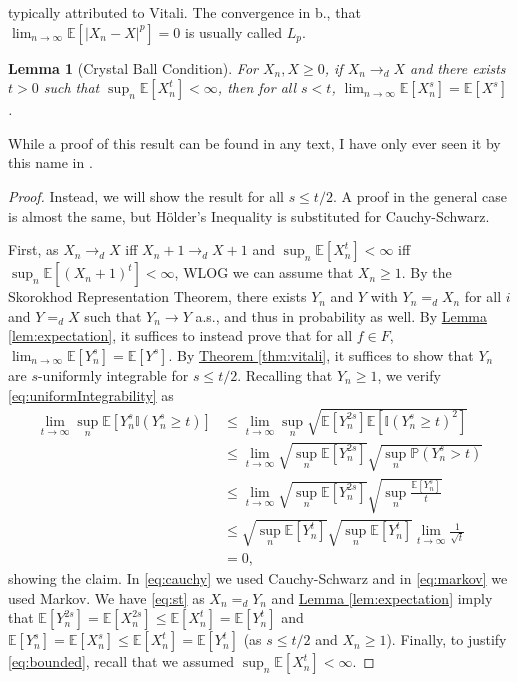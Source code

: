 \documentclass{article}
\newtheorem{lemma}{Lemma}
\theoremstyle{definition}
\renewcommand{\P}{\mathbb P}
\newcommand{\E}{\mathbb E}
\newcommand{\1}{\mathbb I}
\newcommand{\thmhref}[1]{\hyperref[#1]{Theorem \ref{#1}}}
\newcommand{\lemhref}[1]{\hyperref[#1]{Lemma \ref{#1}}}
\begin{document}
typically attributed to Vitali.  The convergence in b., that $\lim_{n
  \to \infty} \E[|X_n - X|^p] = 0$ is usually called $L_p$.
\begin{lemma}[Crystal Ball Condition]
  \label{lem:crystal}
  For $X_n,X \geq 0$, if $X_n \to_d X$ and there exists $t>0$ such that
  $\sup_{n} \E[X_n^t] < \infty$, then for all $s < t$, $\lim_{n \to
    \infty} \E[X_n^s] = \E[X^s]$.
\end{lemma}
While a proof of this result can be found in any text, I have only ever seen it by this name in \cite{resnick1998probability}.
\begin{proof}
  Instead, we will show the result for all $s \leq t/2$.  A proof in
  the general case is almost the same, but H\"older's Inequality is
  substituted for Cauchy-Schwarz.


  First, as $X_n \to_d X$ iff $X_{n}+1 \to_d X+1$ and $\sup_{n}
  \E[X_n^t] < \infty$ iff $\sup_{n} \E[(X_n+1)^t] < \infty$, WLOG we can
  assume that $X_n \geq 1$.  By the Skorokhod Representation Theorem,
  there exists $Y_{n}$ and $Y$ with $Y_{n} =_d X_{n}$ for all $i$ and
  $Y =_d X$ such that $Y_{n} \to Y$ a.s., and thus in probability as
  well.  By \lemhref{lem:expectation}, it suffices to instead prove
  that for all $f \in F$, $\lim_{n \to \infty} \E[Y_{n}^s] = \E[Y^s]$.
  By \thmhref{thm:vitali}, it suffices to show that $Y_{n}$ are
  $s$-uniformly integrable for $s \leq t/2$.  Recalling that $Y_{n}
  \geq 1$, we verify \eqref{eq:uniformIntegrability} as
  \begin{align}
    \label{eq:cauchy}
    \lim_{t \to \infty} \sup_n \E[Y_{n}^s \1(Y_{n}^s \geq t)] &\leq \lim_{t \to \infty} \sup_n \sqrt{\E[Y_{n}^{2s}]\E[\1(Y_{n}^s \geq t)^2]}\\
    \nonumber
    &\leq \lim_{t \to \infty}\sqrt{\sup_n \E[Y_{n}^{2s}]}\sqrt{\sup_n\P(Y_{n}^s > t)}\\
    \label{eq:markov}
    &\leq \lim_{t \to \infty}\sqrt{\sup_n \E[Y_{n}^{2s}]}\sqrt{\sup_n\frac{\E[Y_{n}^s]}{t}}\\
    \label{eq:st}
    &\leq \sqrt{\sup_n \E[Y_{n}^{t}]} \sqrt{\sup_n\E[Y_{n}^t]}\lim_{t \to \infty} \frac{1}{\sqrt{t}}\\
    \label{eq:bounded}
    & =0,
  \end{align}
  showing the claim.  In \eqref{eq:cauchy} we used Cauchy-Schwarz and
  in \eqref{eq:markov} we used Markov.  We have \eqref{eq:st} as
 $X_n =_d Y_n$ and \lemhref{lem:expectation} imply that
  $\E[Y_{n}^{2s}] = \E[X_{n}^{2s}] \leq \E[X_n^t] = \E[Y_n^t]$ and $\E[Y_n^{s}] = \E[X_n^s] \leq \E[X_n^t] = \E[Y_n^t]$ (as $s \leq t/2$ and $X_n \geq 1$).
  Finally, to justify \eqref{eq:bounded}, recall that we assumed
  $\sup_n \E[X_n^t] < \infty$.  
\end{proof}
\end{document}
